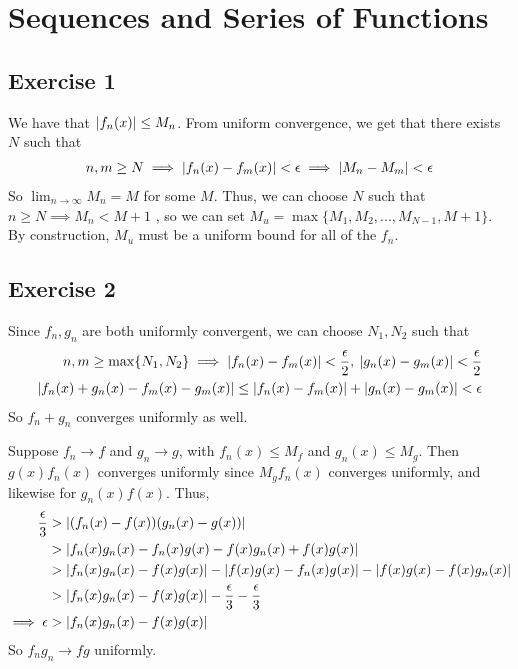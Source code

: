 \section{Sequences and Series of Functions}

\subsection{Exercise 1}
We have that $\abs{f_n(x)} \leq M_n$. From uniform convergence, we get that there exists $N$ such that
\begin{align*}
        n, m \geq N \implies \abs{f_n(x) - f_m(x)} < \epsilon \implies \abs{M_n - M_m} < \epsilon
\end{align*}
So $\lim_{n \to \infty} M_n = M$ for some $M$. Thus, we can choose $N$ such that $n \geq N \implies M_n < M + 1$
, so we can set $M_u = \max\{M_1, M_2, ..., M_{N-1}, M + 1\}$. By construction, $M_u$ must be a uniform
bound for all of the $f_n$.

\subsection{Exercise 2}
Since $f_n, g_n$ are both uniformly convergent, we can choose $N_1, N_2$ such that 
\begin{align*}
        n, m \geq \max\{N_1, N_2\} \implies \abs{f_n(x) - f_m(x)} < \frac{\epsilon}{2}, \: \abs{g_n(x) - g_m(x)} < \frac{\epsilon}{2} \\
        \abs{f_n(x) + g_n(x) - f_m(x) - g_m(x)} \leq \abs{f_n(x) - f_m(x)} + \abs{g_n(x) - g_m(x)} < \epsilon
\end{align*}
So $f_n + g_n$ converges uniformly as well. 

Suppose $f_n \to f$ and $g_n \to g$, with $f_n(x) \leq M_f$ and $g_n(x) \leq M_g$. Then $g(x) f_n(x)$ 
converges uniformly since $M_g f_n(x)$ converges uniformly, and likewise for $g_n(x) f(x)$. Thus,
\begin{align*}
        \frac{\epsilon}{3} &> \abs{(f_n(x) - f(x))(g_n(x) - g(x))} \\
                 &> \abs{f_n(x)g_n(x) - f_n(x)g(x) - f(x)g_n(x) + f(x)g(x)} \\
                 &> \abs{f_n(x)g_n(x) - f(x)g(x)} - \abs{f(x)g(x) - f_n(x)g(x)} - \abs{f(x)g(x) - f(x)g_n(x)} \\
                 &> \abs{f_n(x)g_n(x) - f(x)g(x)} - \frac{\epsilon}{3} - \frac{\epsilon}{3} \\
        \implies \epsilon &> \abs{f_n(x)g_n(x) - f(x)g(x)}
\end{align*}
So $f_n g_n \to fg$ uniformly.

